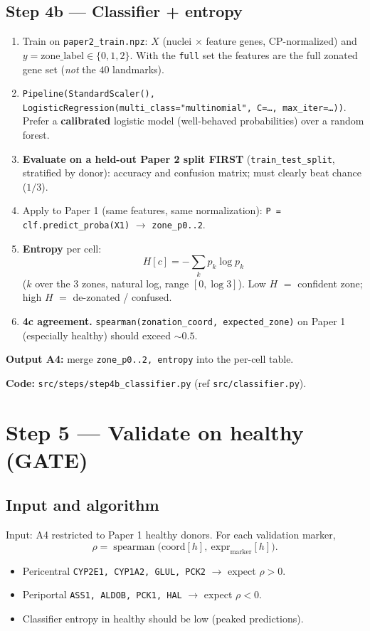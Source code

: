 \documentclass[11pt]{article}
\newcommand{\code}[1]{\texttt{\small #1}}
\newcommand{\coordc}{\mathrm{coord}}
\begin{document}
\subsection{Step 4b --- Classifier + entropy}
\begin{enumerate}[leftmargin=1.6em]
  \item Train on \code{paper2\_train.npz}: $X$ (nuclei $\times$ feature genes, CP-normalized) and
        $y = \text{zone\_label} \in \{0,1,2\}$. With the \code{full} set the features are the full
        zonated gene set (\emph{not} the $40$ landmarks).
  \item \code{Pipeline(StandardScaler(), LogisticRegression(multi\_class="multinomial", C=\ldots,
        max\_iter=\ldots))}. Prefer a \textbf{calibrated} logistic model (well-behaved
        probabilities) over a random forest.
  \item \textbf{Evaluate on a held-out Paper 2 split FIRST} (\code{train\_test\_split}, stratified
        by donor): accuracy and confusion matrix; must clearly beat chance ($1/3$).
  \item Apply to Paper 1 (same features, same normalization):
        \code{P = clf.predict\_proba(X1)} $\rightarrow$ \code{zone\_p0..2}.
  \item \textbf{Entropy} per cell:
        \[
          H[c] = -\sum_{k} p_k \log p_k
        \]
        ($k$ over the $3$ zones, natural log, range $[0, \log 3]$). Low $H$ $=$ confident zone;
        high $H$ $=$ de-zonated / confused.
  \item \textbf{4c agreement.} \code{spearman(zonation\_coord, expected\_zone)} on Paper 1
        (especially healthy) should exceed $\sim 0.5$.
\end{enumerate}

\textbf{Output A4:} merge \code{zone\_p0..2, entropy} into the per-cell table.

\medskip
\noindent\textbf{Code:} \code{src/steps/step4b\_classifier.py} (ref \code{src/classifier.py}).

\section{Step 5 --- Validate on healthy (GATE)}

\subsection{Input and algorithm}
Input: A4 restricted to Paper 1 healthy donors. For each validation marker,
\[
  \rho = \operatorname{spearman}\big(\coordc[h],\ \text{expr}_{\text{marker}}[h]\big).
\]
\begin{itemize}[leftmargin=1.4em]
  \item Pericentral \code{CYP2E1, CYP1A2, GLUL, PCK2} $\rightarrow$ expect $\rho > 0$.
  \item Periportal \code{ASS1, ALDOB, PCK1, HAL} $\rightarrow$ expect $\rho < 0$.
  \item Classifier entropy in healthy should be low (peaked predictions).
\end{itemize}
\end{document}
